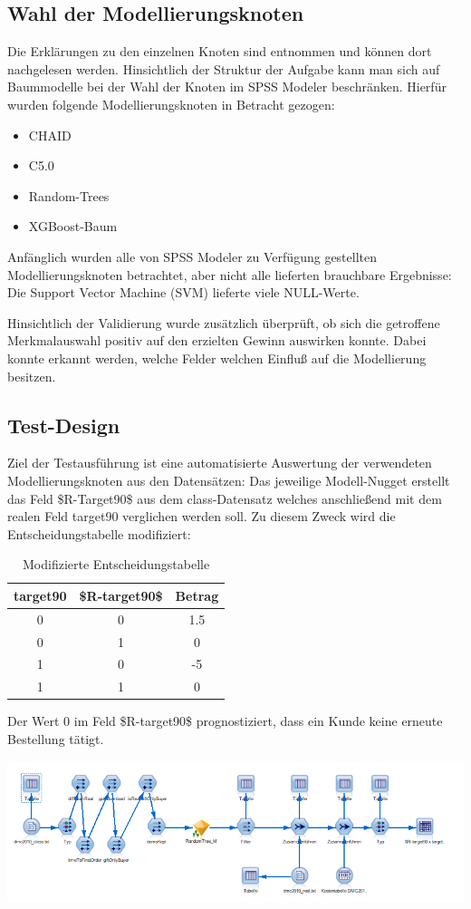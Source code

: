 \documentclass[a4paper,12pt]{article}
\begin{document}
\subsection{Wahl der Modellierungsknoten}
Die Erklärungen zu den einzelnen Knoten sind \cite{nodes} entnommen und können dort nachgelesen werden. 
Hinsichtlich der Struktur der Aufgabe kann man sich auf Baummodelle bei der Wahl der Knoten im SPSS Modeler beschränken. Hierfür wurden folgende Modellierungsknoten in Betracht gezogen:
\begin{itemize}
\item CHAID
\item C5.0
	\item Random-Trees
	\item XGBoost-Baum
\end{itemize} 

Anfänglich  wurden alle von SPSS Modeler zu Verfügung gestellten Modellierungsknoten betrachtet, aber nicht alle lieferten brauchbare
Ergebnisse: Die Support Vector Machine (SVM) lieferte viele NULL-Werte.
\par
Hinsichtlich der Validierung wurde zusätzlich überprüft, ob sich die getroffene Merkmalauswahl positiv auf den erzielten Gewinn auswirken konnte. Dabei konnte erkannt werden, welche Felder welchen Einfluß auf die Modellierung besitzen.
\subsection{Test-Design}
Ziel der Testausführung ist eine automatisierte Auswertung der verwendeten Modellierungsknoten aus den Datensätzen:
Das jeweilige Modell-Nugget erstellt das Feld \$R-Target90\$ aus dem class-Datensatz welches anschließend mit dem realen Feld target90 verglichen werden soll.
Zu diesem Zweck wird die Entscheidungstabelle modifiziert:
\begin{table}[h]
\begin{center}
\begin{tabular}{c | c | c}
target90 & \$R-target90\$ & Betrag
\\
\hline
0 & 0 & 1.5
\\
\hline
0 & 1 & 0
\\
\hline
1 & 0 & -5
\\
\hline
1 & 1  & 0
\end{tabular}
\caption{Modifizierte Entscheidungstabelle}
\end{center}
\end{table}
Der Wert 0 im Feld \$R-target90\$ prognostiziert, dass ein Kunde keine erneute Bestellung tätigt.
\begin{center}
\includegraphics[width=\textwidth]{Screens/test_bewertung}
\end{center}
\end{document}
